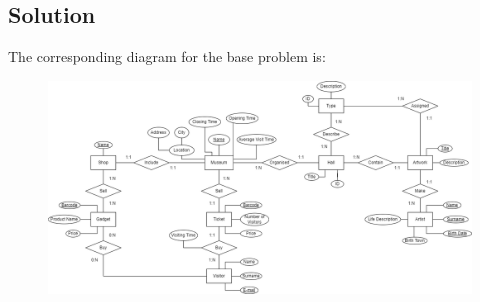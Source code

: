 \subsection{Solution}
The corresponding diagram for the base problem is:
\begin{figure}[H]
    \centering
    \includegraphics[width=1.00\linewidth]{images/er1.png}
\end{figure}
